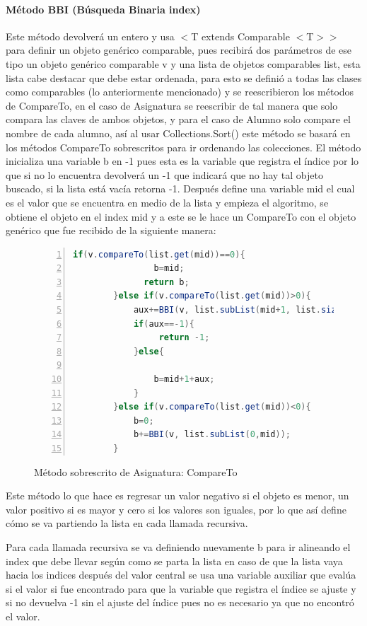 \documentclass{report}
\begin{document}
\paragraph{Método BBI (Búsqueda Binaria index)}
Este método devolverá un entero y usa \(<\)T extends Comparable \(<\)T\(>\)\(>\) para definir un objeto genérico comparable, pues recibirá dos parámetros de ese tipo un objeto genérico comparable v y una lista de objetos comparables list, esta lista cabe destacar que debe estar ordenada, para esto se definió a todas las clases como comparables (lo anteriormente mencionado) y se reescribieron los métodos de CompareTo, en el caso de Asignatura se reescribir de tal manera que solo compara las claves de ambos objetos, y para el caso de Alumno solo compare el nombre de cada alumno, así al usar Collections.Sort() este método se basará en los métodos CompareTo sobrescritos para ir ordenando las colecciones.
El método inicializa una variable b en -1 pues esta es la variable que registra el índice por lo que si no lo encuentra devolverá un -1 que indicará que no hay tal objeto buscado, si la lista está vacía retorna -1.
Después define una variable mid el cual es el valor que se encuentra en medio de la lista y empieza el algoritmo, se obtiene el objeto en el index mid y a este se le hace un CompareTo con el objeto genérico que fue recibido de la siguiente manera:
\begin{figure}[htbp]
\centering
\begin{lstlisting}[language=Java, frame=lines, framesep=2mm, basicstyle=\footnotesize\ttfamily, numbers=left]
 if(v.compareTo(list.get(mid))==0){
                b=mid;
              return b;      
        }else if(v.compareTo(list.get(mid))>0){
            aux+=BBI(v, list.subList(mid+1, list.size()));
            if(aux==-1){
                 return -1;  
            }else{
              
                b=mid+1+aux;
            }
        }else if(v.compareTo(list.get(mid))<0){
            b=0;
            b+=BBI(v, list.subList(0,mid));
        }
\end{lstlisting}
\caption{Método sobrescrito de Asignatura: CompareTo}
\end{figure}
Este método lo que hace es regresar un valor negativo si el objeto es menor, un valor positivo si es mayor y cero si los valores son iguales, por lo que así define cómo se va partiendo la lista en cada llamada recursiva.

Para cada llamada recursiva se va definiendo nuevamente b para ir alineando el index que debe llevar según como se parta la lista en caso de que la lista vaya hacia los indices después del valor central se usa una variable auxiliar que evalúa si el valor si fue encontrado para que la variable que registra el índice se ajuste y si no devuelva -1 sin el ajuste del índice pues no es necesario ya que no encontró el valor.
\end{document}
